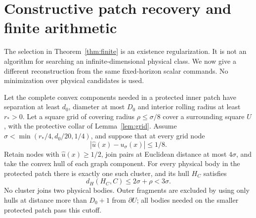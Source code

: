 \section{Constructive patch recovery and finite arithmetic}
\label{sec:constructive}
The selection in Theorem~\ref{thm:finite} is an existence regularization.
It is not an algorithm for searching an infinite-dimensional physical
class. We now give a different reconstruction from the same fixed-horizon
scalar commands. No minimization over physical candidates is used.

\begin{lemma}\label{lem:hulls}
Let the complete convex components needed in a protected inner patch
have separation at least $d_0$, diameter at most $D_0$ and interior
rolling radius at least $r_*>0$. Let a square grid of covering radius
$\rho\le\sigma/8$ cover a surrounding square $U$, with the protective
collar of Lemma~\ref{lem:grid}. Assume
$\sigma<\min(r_*/4,d_0/20,1/4)$, and suppose that at every grid node
\begin{equation}\label{eq:grid-value-error}
                    |\widehat u(x)-u_\sigma(x)|\le1/8.
\end{equation}
Retain nodes with $\widehat u(x)\ge1/2$, join pairs at Euclidean distance
at most $4\sigma$, and take the convex hull of each graph component.
For every physical body in the protected patch there is exactly one
such cluster, and its hull $H_C$ satisfies
\begin{equation}\label{eq:hull-error}
                         d_H(H_C,C)\le2\sigma+\rho<3\sigma.
\end{equation}
No cluster joins two physical bodies. Outer fragments are excluded by
using only hulls at distance more than $D_0+1$ from $\partial U$;
all bodies needed on the smaller protected patch pass this cutoff.
\end{lemma}
